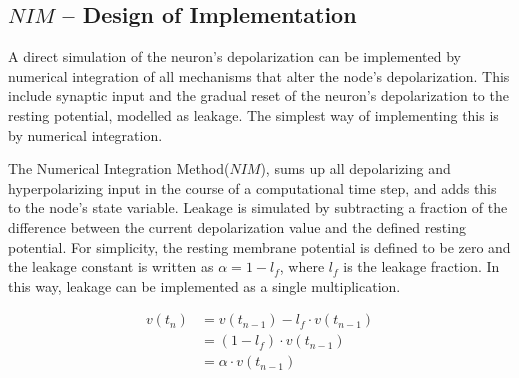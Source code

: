 
	\subsection{$NIM$ -- Design of Implementation}
		A direct simulation of the neuron's depolarization can be implemented by numerical integration of all mechanisms that alter the node's depolarization.
		This include synaptic input and the gradual reset of the neuron's depolarization to the resting potential, modelled as leakage.
		The simplest way of implementing this is by numerical integration.

		The Numerical Integration Method($NIM$), sums up all depolarizing and hyperpolarizing input in the course of a computational time step, and adds this to the node's state variable. 
		Leakage is simulated by subtracting a fraction of the difference between the current depolarization value and the defined resting potential.
		For simplicity, the resting membrane potential is defined to be zero and the leakage constant is written as $\alpha=1-l_f$, where $l_f$ is the leakage fraction.
		In this way, leakage can be implemented as a single multiplication.

\begin{equation}
	\begin{split}
		v(t_n) 	&= v(t_{n-1})-l_f \cdot v(t_{n-1})  	\\
				&= (1-l_f)\cdot v(t_{n-1}) 				\\
				&= \alpha \cdot v(t_{n-1})
	\end{split}
	\label{eqLeakageForLIF}
\end{equation}
		
